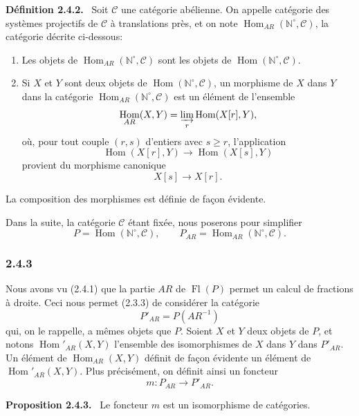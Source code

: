 \documentclass[11pt]{article}
\providecommand{\NN}{\mathbb{N}}
\newenvironment{statement}[1]{\par\medskip\noindent\textbf{#1.}\ }{\par\medskip}
\DeclareMathOperator{\Hom}{Hom}
\providecommand{\Hom}{\operatorname{Hom}}
\providecommand{\Fl}{\operatorname{Fl}}
\providecommand{\NN}{\mathbb N}
\providecommand{\cC}{\mathcal C}
\providecommand{\cC}{\mathcal C}
\providecommand{\Hom}{\operatorname{Hom}}
\begin{document}
\begin{statement}{Définition 2.4.2}
Soit $\cC$ une catégorie abélienne. On appelle catégorie des systèmes projectifs de $\cC$ à translations près, et on note $\Hom_{AR}(\NN^\circ,\cC)$, la catégorie décrite ci-dessous:
\begin{enumerate}[label=(\roman*)]
\item Les objets de $\Hom_{AR}(\NN^\circ,\cC)$ sont les objets de $\Hom(\NN^\circ,\cC)$.
\item Si $X$ et $Y$ sont deux objets de $\Hom(\NN^\circ,\cC)$, un morphisme de $X$ dans $Y$ dans la catégorie $\Hom_{AR}(\NN^\circ,\cC)$ est un élément de l'ensemble
\[
\Hom_{AR}(X,Y)=\varinjlim_r\Hom(X[r],Y),
\]
où, pour tout couple $(r,s)$ d'entiers avec $s\ge r$, l'application
\[
\Hom(X[r],Y)\longrightarrow\Hom(X[s],Y)
\]
provient du morphisme canonique
\[
X[s]\longrightarrow X[r].
\]
\end{enumerate}
La composition des morphismes est définie de façon évidente.
\end{statement}
Dans la suite, la catégorie $\cC$ étant fixée, nous poserons pour simplifier
\[
P=\Hom(\NN^\circ,\cC),\qquad P_{AR}=\Hom_{AR}(\NN^\circ,\cC).
\]

\subsubsection*{2.4.3}
Nous avons vu (2.4.1) que la partie $AR$ de $\Fl(P)$ permet un calcul de fractions à droite. Ceci nous permet (2.3.3) de considérer la catégorie
\[
P'_{AR}=P(AR^{-1})
\]
qui, on le rappelle, a mêmes objets que $P$. Soient $X$ et $Y$ deux objets de $P$, et notons $\Hom'_{AR}(X,Y)$ l'ensemble des isomorphismes de $X$ dans $Y$ dans $P'_{AR}$. Un élément de $\Hom_{AR}(X,Y)$ définit de façon évidente un élément de $\Hom'_{AR}(X,Y)$. Plus précisément, on définit ainsi un foncteur
\[
m:P_{AR}\longrightarrow P'_{AR}.
\]

\begin{statement}{Proposition 2.4.3}
Le foncteur $m$ est un isomorphisme de catégories.
\end{statement}
\end{document}
